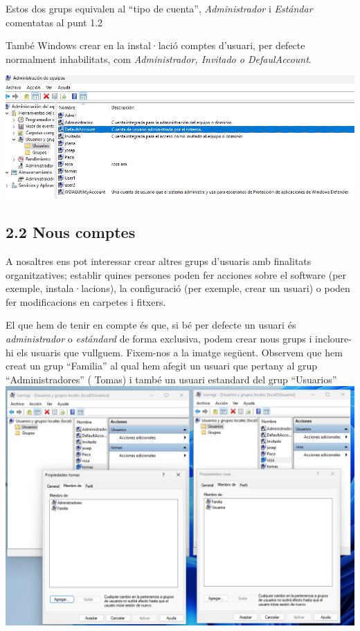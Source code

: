 \documentclass[
  a4paper,
]{article}
\begin{document}
Estos dos grups equivalen al ``tipo de cuenta'', \emph{Administrador} i
\emph{Estándar} comentatas al punt 1.2

També Windows crear en la instal·lació comptes d'usuari, per defecte
normalment inhabilitats, com \emph{Administrador, Invitado o
DefaulAccount}.

\includegraphics{png/usuarisCompmgmt.png}

\subsection{2.2 Nous comptes}\label{nous-comptes}

A nosaltres ens pot interessar crear altres grups d'usuaris amb
finalitats organitzatives; establir quines persones poden fer acciones
sobre el software (per exemple, instala·lacions), la configuració (per
exemple, crear un usuari) o poden fer modificacions en carpetes i
fitxers.

El que hem de tenir en compte és que, si bé per defecte un usuari és
\emph{administrador} o \emph{estándard} de forma exclusiva, podem crear
nous grups i incloure-hi els usuaris que vullguem. Fixem-nos a la imatge
següent. Observem que hem creat un grup ``Familia'' al qual hem afegit
un usuari que pertany al grup ``Administradores'' ( Tomas) i també un
usuari estandard del grup ``Usuarios''
\includegraphics{png/mesdungrup.png}
\end{document}
